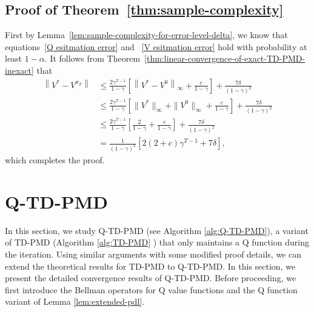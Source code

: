\documentclass[10pt]{article}
\newcommand{\ls}{\left}
\newcommand{\rs}{\right}
\theoremstyle{plain}
\theoremstyle{definition}
\begin{document}
\subsection{Proof of Theorem~\ref{thm:sample-complexity}}
\label{sec:pf:thm:sample-complexity}

First by Lemma~\ref{lem:sample-complexity-for-error-level-delta},  we know that  equations~\eqref{Q esitmation error} and ~\eqref{V esitmation error} hold with probability at least $1-\alpha$. It follows from Theorem~\ref{thm:linear-convergence-of-exact-TD-PMD-inexact} that
\begin{align*}
    \ls\| V^* - V^{\pi_T} \rs\| &\leq \frac{2\gamma^{T-1}}{1-\gamma} \ls[ \ls\| V^* - V^0 \rs\|_\infty + \frac{c}{1-\gamma} \rs] + \frac{7\delta}{(1-\gamma)^2} \\
    &\leq \frac{2\gamma^{T-1}}{1-\gamma} \ls[ \| V^* \|_\infty + \| V^0 \|_\infty + \frac{c}{1-\gamma} \rs] + \frac{7\delta}{(1-\gamma)^2} \\
    &\leq \frac{2\gamma^{T-1}}{1-\gamma} \ls[ \frac{2}{1-\gamma} + \frac{c}{1-\gamma} \rs] + \frac{7\delta}{(1-\gamma)^2} \\
    &= \frac{1}{(1-\gamma)^2} [2(2+c)\gamma^{T-1} + 7\delta],
\end{align*}
which completes the proof.


\section{Q-TD-PMD}
\label{sec:Q-TD-PMD}
In this section, we study Q-TD-PMD (see Algorithm \ref{alg:Q-TD-PMD}), a variant of TD-PMD (Algorithm \ref{alg:TD-PMD} ) that only maintains a Q function during the iteration. Using similar arguments with some modified proof details, we can extend the theoretical results for TD-PMD to  Q-TD-PMD. In this section, we present the detailed convergence results of Q-TD-PMD. Before proceeding, we first introduce the Bellman operators for Q value functions and the Q function variant of Lemma \ref{lem:extended-pdl}.
\end{document}
